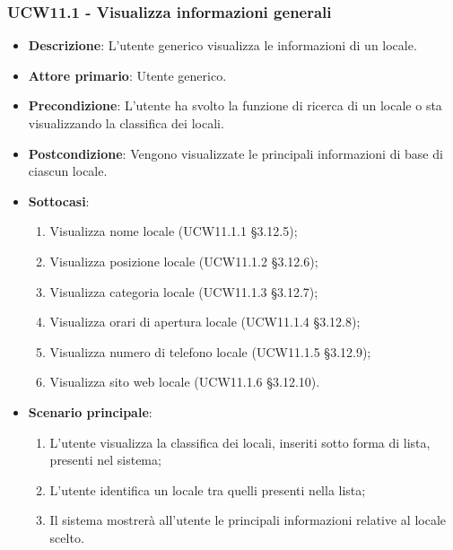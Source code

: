 \subsubsection{UCW11.1 - Visualizza informazioni generali}
\begin{itemize}
    \item \textbf{Descrizione}: L'utente generico visualizza le informazioni di un locale.
    \item \textbf{Attore primario}: Utente generico.
    \item \textbf{Precondizione}: L'utente ha svolto la funzione di ricerca di un locale o sta visualizzando la classifica dei locali.
    \item \textbf{Postcondizione}: Vengono visualizzate le principali informazioni di base di ciascun locale.
	\item \textbf{Sottocasi}:
	\begin{enumerate}
		\item Visualizza nome locale (UCW11.1.1 \S{}3.12.5);
		\item Visualizza posizione locale (UCW11.1.2 \S{}3.12.6);
		\item Visualizza categoria locale (UCW11.1.3 \S{}3.12.7);
		\item Visualizza orari di apertura locale (UCW11.1.4 \S{}3.12.8);
		\item Visualizza numero di telefono locale (UCW11.1.5 \S{}3.12.9);
		\item Visualizza sito web locale (UCW11.1.6 \S{}3.12.10).
	\end{enumerate}
    \item \textbf{Scenario principale}: 
    \begin{enumerate}
	\item L'utente visualizza la classifica dei locali, inseriti sotto forma di lista, presenti nel sistema;
    \item L'utente identifica un locale tra quelli presenti nella lista;
    \item Il sistema mostrerà all'utente le principali informazioni relative al locale scelto.
    \end{enumerate}
\end{itemize}

